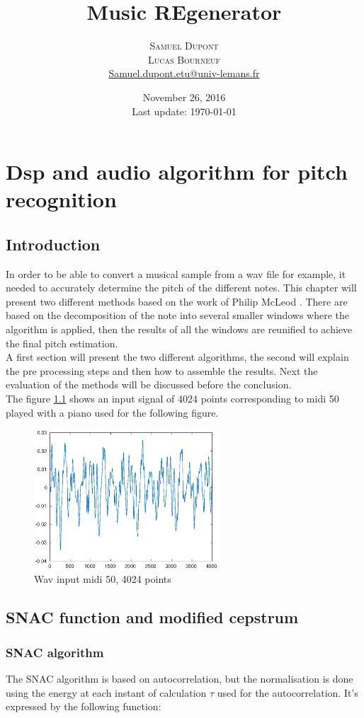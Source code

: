 \documentclass[twoside,twocolumn]{report}
\title{Music REgenerator } %
\author{%
\textsc{Samuel Dupont}\\ %
\textsc{Lucas Bourneuf}\\%
\normalsize \href{mailto:Samuel.dupont.etu@univ-lemans.fr}{Samuel.dupont.etu@univ-lemans.fr } 
}
\date{November 26, 2016 \\ Last update: \today}
\begin{document}
\maketitle

\chapter{Dsp and audio algorithm for pitch recognition}
\section{Introduction}
In order to be able to convert a musical sample from a wav file for example, it needed to accurately determine the pitch of the different notes. This chapter will present two different methods based on the work of Philip McLeod \cite{mcleod2009fast}. There are based on the decomposition of the note into several smaller windows where the algorithm is applied, then the results of all the windows are reunified to achieve the final pitch estimation. \\
A first section will present the two different algorithms,  the second will explain the pre processing steps and then how to assemble the results. Next the evaluation of the methods will be discussed before the conclusion.\\
The figure \ref{input50} shows an input signal of 4024 points corresponding to midi 50 played with a piano used for the following figure.
\begin{figure}[h!]
	\centering
	\includegraphics[width=260px]{./images/input_midi50.eps}
	\caption{Wav input midi 50, 4024 points}
	\label{input50}
\end{figure}
\section{SNAC function and modified cepstrum}
\subsection{SNAC algorithm}
The SNAC algorithm is based on autocorrelation, but the normalisation is done using the energy at each instant of calculation $\tau$ used for the autocorrelation. It's expressed by the following function:
\end{document}
